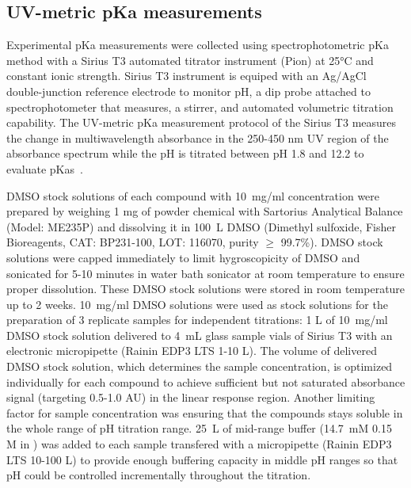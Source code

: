 \documentclass[9pt,lineno]{elife}
\begin{document}
\subsection{UV-metric pKa measurements}

Experimental pKa measurements were collected using spectrophotometric pKa method with a Sirius T3 automated titrator instrument (Pion) at 25°C and constant ionic strength. Sirius T3 instrument is equiped with an Ag/AgCl double-junction reference electrode to monitor pH, a dip probe attached to spectrophotometer that measures, a stirrer, and automated volumetric titration capability. The UV-metric pKa measurement protocol of the Sirius T3 measures the change in multiwavelength absorbance in the 250-450 nm UV region of the absorbance spectrum while the pH is titrated between pH 1.8 and 12.2 to evaluate pKas~\citep{tam_multi-wavelength_2001, allen_multiwavelength_1998}. 

DMSO stock solutions of each compound with 10~mg/ml concentration were prepared by weighing 1 mg of powder chemical with Sartorius Analytical Balance (Model: ME235P) and dissolving it in 100~\micro L DMSO (Dimethyl sulfoxide, Fisher Bioreagents, CAT: BP231-100, LOT: 116070, purity $\geq$ 99.7\%).  DMSO stock solutions were capped immediately to limit hygroscopicity of DMSO and sonicated for 5-10 minutes in water bath sonicator at room temperature to ensure proper dissolution. These DMSO stock solutions were stored in room temperature up to 2 weeks. 10~mg/ml DMSO solutions were used as stock solutions for the preparation of 3 replicate samples for independent titrations:  1 \micro L of 10~mg/ml DMSO stock solution delivered to 4~mL glass sample vials of Sirius T3 with an electronic micropipette (Rainin EDP3 LTS 1-10 \micro L). The volume of delivered DMSO stock solution, which determines the sample concentration, is optimized individually for each compound to achieve sufficient but not saturated absorbance signal (targeting 0.5-1.0 AU) in the linear response region. Another limiting factor for sample concentration was ensuring that the compounds stays soluble in the whole range of pH titration range. 25~\micro L of mid-range buffer (14.7~mM  0.15 M  in ) was added to each sample transfered with a micropipette (Rainin EDP3 LTS 10-100 \micro L) to provide enough buffering capacity in middle pH ranges so that pH could be controlled incrementally throughout the titration.  
\end{document}
